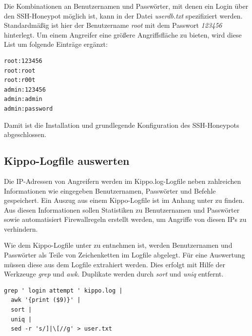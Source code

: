 Die Kombinationen an Benutzernamen und Passwörter, mit denen ein Login über den SSH-Honeypot möglich ist, kann in der Datei \textit{userdb.txt} spezifiziert werden. Standardmäßig ist hier der Benutzername \textit{root} mit dem Passwort \textit{123456} hinterlegt. Um einem Angreifer eine größere Angriffsfläche zu bieten, wird diese List um folgende Einträge ergänzt:

\begin{lstlisting}[style=customc]
root:123456
root:root
root:r00t
admin:123456
admin:admin
admin:password
\end{lstlisting}

Damit ist die Installation und grundlegende Konfiguration des SSH-Honeypots abgeschlossen.

\subsection{Kippo-Logfile auswerten}
\label{subsec:Kippo-Logfile auswerten}


Die IP-Adressen von Angreifern werden im Kippo.log-Logfile neben zahlreichen Informationen wie eingegeben Benutzernamen, Passwörter und Befehle gespeichert. Ein Auszug aus einem Kippo-Logfile ist im Anhang unter \textit{} zu finden. Aus diesen Informationen sollen Statistiken zu Benutzernamen und Passwörter sowie automatisiert Firewallregeln erstellt werden, um Angriffe von diesen IPs zu verhindern.

Wie dem Kippo-Logfile unter \textit{} zu entnehmen ist, werden Benutzernamen und Passwörter als Teile von Zeichenketten im Logfile abgelegt. Für eine Auswertung müssen diese aus dem Logfile extrahiert werden. Dies erfolgt mit Hilfe der Werkzeuge \textit{grep} und \textit{awk}. Duplikate werden durch \textit{sort} und \textit{uniq} entfernt.



\begin{lstlisting}[style=customc]
grep ' login attempt ' kippo.log |
  awk '{print ($9)}' |
  sort |
  uniq |
  sed -r 's/]|\[//g' > user.txt

\end{lstlisting}

